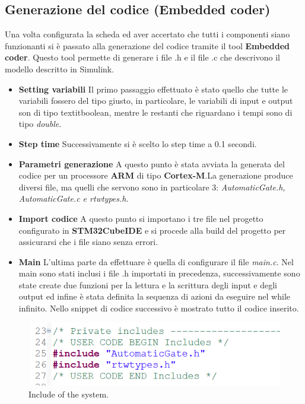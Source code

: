 \documentclass[12pt]{article}
\begin{document}
\newpage
\subsection{Generazione del codice (Embedded coder)}

Una volta configurata la scheda ed aver accertato che tutti i componenti siano funzionanti si è passato alla generazione del codice tramite il tool \textbf{Embedded coder}. Questo tool permette di generare i file .h e il file .c che descrivono il modello descritto in Simulink.
\begin{itemize}
    \item {\textbf{Setting variabili}} Il primo passaggio effettuato è stato quello che tutte le variabili fossero del tipo giusto, in particolare, le variabili di input e output son di tipo textit{boolean}, mentre le restanti che riguardano i tempi sono di tipo \textit{double}.
    \item {\textbf{Step time}} Successivamente si è scelto lo step time a 0.1 secondi.
    \item {\textbf{Parametri generazione}} A questo punto è stata avviata la generata del codice per un processore \textbf{ARM} di tipo \textbf{Cortex-M}.La generazione produce diversi file, ma quelli che servono sono in particolare 3: \textit{AutomaticGate.h, AutomaticGate.c e rtwtypes.h}.
    \item {\textbf{Import codice}} A questo punto si importano i tre file nel progetto configurato in \textbf{STM32CubeIDE} e si procede alla build del progetto per assicurarsi che i file siano senza errori.
    \item {\textbf{Main}} L'ultima parte da effettuare è quella di configurare il file \textit{main.c}. Nel main sono stati inclusi i file .h importati in precedenza, successivamente sono state create due funzioni per la lettura e la scrittura degli input e degli output ed infine è stata definita la sequenza di azioni da eseguire nel while infinito. Nello snippet di codice successivo è mostrato tutto il codice inserito.
\end{itemize}
\begin{figure}[H]
    \hspace{0.4cm}
    \includegraphics[width=1\textwidth]{snippet/include.png}
    \caption{Include of the system.}
\end{figure}
\end{document}

